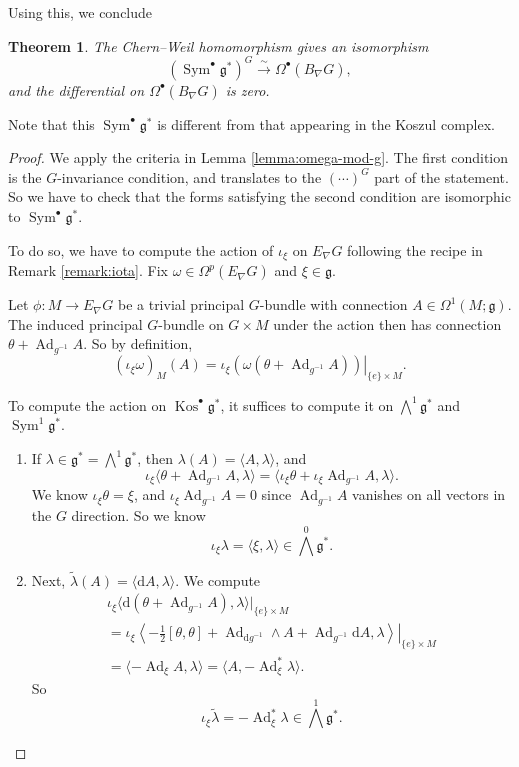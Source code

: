 \documentclass{shortart}
\newtheorem{thm}{Theorem}
\theoremstyle{definition}
\DeclareMathOperator\Ad{Ad}
\DeclareMathOperator\Sym{Sym}
\DeclareMathOperator\Kos{Kos}
\newcommand\exterior{{\textstyle \bigwedge}}
\renewcommand\d{\mathrm{d}}
\begin{document}
Using this, we conclude
\begin{thm}
  The Chern--Weil homomorphism gives an isomorphism
  \[
    (\Sym^\bullet \mathfrak{g}^*)^G \overset{\sim}{\to} \Omega^\bullet(B_\nabla G),
  \]
  and the differential on $\Omega^\bullet(B_\nabla G)$ is zero.
\end{thm}
Note that this $\Sym^\bullet \mathfrak{g}^*$ is different from that appearing in the Koszul complex.

\begin{proof}
  We apply the criteria in Lemma \ref{lemma:omega-mod-g}. The first condition is the $G$-invariance condition, and translates to the $(\cdots)^G$ part of the statement. So we have to check that the forms satisfying the second condition are isomorphic to $\Sym^\bullet \mathfrak{g}^*$.

  To do so, we have to compute the action of $\iota_\xi$ on $E_\nabla G$ following the recipe in Remark \ref{remark:iota}. Fix $\omega \in \Omega^p(E_\nabla G)$ and $\xi \in \mathfrak{g}$.

  Let $\phi: M \to E_\nabla G$ be a trivial principal $G$-bundle with connection $A \in \Omega^1(M; \mathfrak{g})$. The induced principal $G$-bundle on $G \times M$ under the action then has connection $\theta + \Ad_{g^{-1}} A$. So by definition,
  \[
    (\iota_\xi \omega)_M(A) = \left.\iota_\xi \left(\omega(\theta + \Ad_{g^{-1}} A)\right)\right|_{\{e\} \times M}.
  \]

  To compute the action on $\Kos^\bullet \mathfrak{g}^*$, it suffices to compute it on $\exterior^1 \mathfrak{g}^*$ and $\Sym^1 \mathfrak{g}^*$.

  \begin{enumerate}
    \item If $\lambda \in \mathfrak{g}^* = \exterior^1 \mathfrak{g}^*$, then $\lambda(A) = \langle A, \lambda\rangle$, and
      \[
        \iota_\xi \langle \theta + \Ad_{g^{-1}} A, \lambda\rangle = \langle \iota_\xi \theta + \iota_\xi \Ad_{g^{-1}} A, \lambda\rangle.
      \]
      We know $\iota_\xi \theta = \xi$, and $\iota_\xi \Ad_{g^{-1}} A = 0$ since $\Ad_{g^{-1}} A$ vanishes on all vectors in the $G$ direction. So we know
      \[
        \iota_\xi \lambda = \langle \xi, \lambda\rangle \in \exterior^0 \mathfrak{g}^*.
      \]

    \item Next, $\tilde{\lambda}(A) = \langle \d A, \lambda \rangle$. We compute
      \begin{multline*}
        \iota_\xi \langle \d (\theta + \Ad_{g^{-1}}A), \lambda \rangle|_{\{e\} \times M} \\
        = \left.\iota_\xi \left\langle -\frac{1}{2}[\theta, \theta] + \Ad_{\d g^{-1}} \wedge A + \Ad_{g^{-1}} \d A, \lambda\right\rangle\right|_{\{e\} \times M}\\
          = \langle -\Ad_\xi A, \lambda\rangle = \langle A, -\Ad_\xi^* \lambda\rangle.
        \end{multline*}
      So
      \[
        \iota_\xi \tilde{\lambda} = -\Ad^*_\xi \lambda \in \exterior^1 \mathfrak{g}^*.
      \]
  \end{enumerate}


\end{proof}
\end{document}
